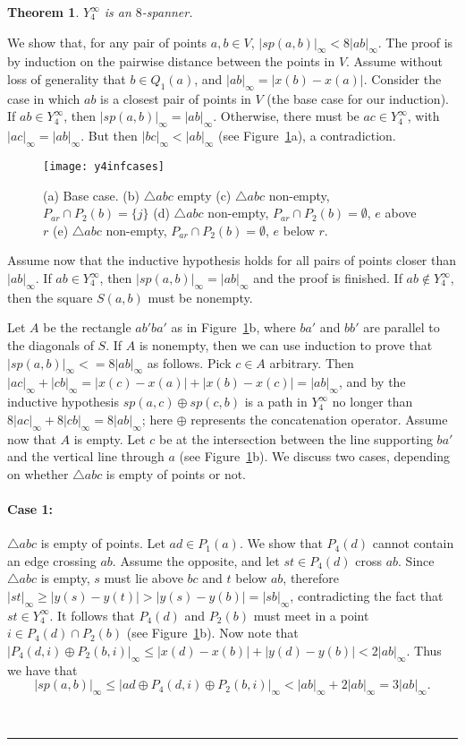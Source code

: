 \pdfoutput=1  \documentclass[11pt]{article}
\newtheorem{theorem}{Theorem}
\newcommand{\qed}{\rule{0.5em}{1.5ex}}
\newcommand{\fqed}{{\hfill~\qed}}
\newenvironment{proof}{{\noindent \bf Proof.}}
                      {{\hfill \fqed} \vspace{1em}}
\begin{document}
\begin{theorem}
$Y_4^\infty$ is an $8$-spanner.
\label{thm:y4infspanner}
\end{theorem}
\begin{proof}
We show that, for any pair of points $a, b \in V$, $|sp(a,b)|_\infty < 8|ab|_\infty$.
The proof is by induction on the pairwise distance between the points in $V$.
Assume without loss of generality that $b \in Q_1(a)$, and $|ab|_\infty = |x(b)-x(a)|$.
Consider the case in which $ab$ is a closest pair of points in $V$ (the base case
for our induction). If $ab \in Y_4^\infty$, then $|sp(a,b)|_\infty = |ab|_\infty$.
Otherwise, there must be $ac \in Y_4^\infty$, with
$|ac|_\infty = |ab|_\infty$. But then $|bc|_\infty < |ab|_\infty$
(see Figure~\ref{fig:y4inf}a), a contradiction.

\begin{figure}[htp]
\centering
\texttt{[image: y4infcases]}
\caption{(a) Base case. (b) $\triangle abc$ empty (c) $\triangle abc$ non-empty, $P_{ar} \cap P_2(b) = \{j\}$
(d) $\triangle abc$ non-empty, $P_{ar} \cap P_2(b) = \emptyset$, $e$ above $r$
(e) $\triangle abc$ non-empty, $P_{ar} \cap P_2(b) = \emptyset$, $e$ below $r$.}
\label{fig:y4inf}
\end{figure}


Assume now that the inductive hypothesis holds for all pairs of points
closer than $|ab|_\infty$. If $ab \in Y_4^\infty$, then $|sp(a,b)|_\infty = |ab|_\infty$
and the proof is finished. If $ab \notin Y_4^\infty$, then the square $S(a,b)$ must be nonempty.

Let $A$ be the rectangle $ab'ba'$ as in Figure~\ref{fig:y4inf}b, where $ba'$ and
$bb'$ are parallel to the diagonals of $S$.
If $A$ is nonempty, then we can use induction to prove that $|sp(a,b)|_\infty <= 8|ab|_\infty$
as follows. Pick $c \in A$ arbitrary. Then $|ac|_\infty + |cb|_\infty = |x(c)-x(a)| + |x(b)-x(c)|
= |ab|_\infty$,
and by the inductive hypothesis $sp(a,c) \oplus sp(c,b)$ is a path in $Y_4^\infty$ no
longer than $8|ac|_\infty + 8|cb|_\infty = 8|ab|_\infty$; here $\oplus$ represents the 
concatenation operator.
Assume now that $A$ is empty.
Let $c$ be at the intersection between the line supporting $ba'$ and the
vertical line through $a$ (see Figure~\ref{fig:y4inf}b).
We discuss two cases, depending on whether
$\triangle abc$ is empty of points or not.

\paragraph{Case 1: } $\triangle abc$ is empty of points. Let $ad \in P_1(a)$. We show that
$P_4(d)$ cannot contain an edge crossing $ab$. Assume the opposite, and let
$st \in P_4(d)$ cross $ab$. Since $\triangle abc$ is empty, $s$ must lie above
$bc$ and $t$ below $ab$,  therefore
$|st|_\infty \ge |y(s)-y(t)| > |y(s)-y(b)| = |sb|_\infty$,
contradicting the fact that $st \in Y_4^\infty$. It follows that
$P_4(d)$ and $P_2(b)$ must meet in a point $i \in P_4(d) \cap P_2(b)$ (see Figure~\ref{fig:y4inf}b).
Now note that
$|P_4(d, i)\oplus P_2(b,i)|_\infty
    \le |x(d)-x(b)| + |y(d)-y(b)| < 2|ab|_\infty$.
Thus we have that
\[
  |sp(a, b)|_\infty \le |ad \oplus P_4(d, i)\oplus P_2(b,i)|_\infty
  < |ab|_\infty + 2|ab|_\infty = 3|ab|_\infty.
\]

\end{proof}
\end{document}
